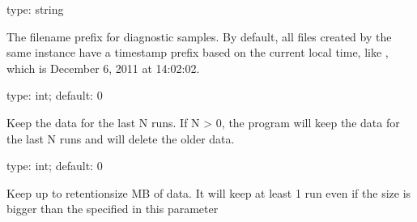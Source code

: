 \documentclass[letterpaper,10pt,english]{sphinxmanual}
\begin{document}
\begin{fulllineitems}
\label{\detokenize{mariadb-stat:cmdoption-mariadb-stat-prefix}}
type: string

The filename prefix for diagnostic samples.  By default, all files created
by the same {\hyperref[\detokenize{mariadb-stat:cmdoption-mariadb-stat-collect}]{}} instance have a timestamp prefix based on the current
local time, like , which is December 6, 2011 at 14:02:02.

\end{fulllineitems}


\begin{fulllineitems}
\label{\detokenize{mariadb-stat:cmdoption-mariadb-stat-retention-count}}
type: int; default: 0

Keep the data for the last N runs. If N \textgreater{} 0, the program will keep the data for the last
N runs and will delete the older data.

\end{fulllineitems}


\begin{fulllineitems}
\label{\detokenize{mariadb-stat:cmdoption-mariadb-stat-retention-size}}
type: int; default: 0

Keep up to \textendash{}retention\sphinxhyphen{}size MB of data. It will keep at least 1 run even if the size is bigger
than the specified in this parameter

\end{fulllineitems}
\end{document}
